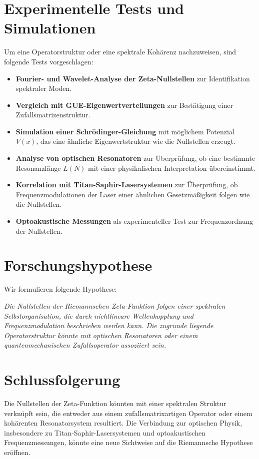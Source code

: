 \documentclass[a4paper,12pt]{article}
\begin{document}
\section{Experimentelle Tests und Simulationen}
Um eine Operatorstruktur oder eine spektrale Kohärenz nachzuweisen, sind folgende Tests vorgeschlagen:
\begin{itemize}
    \item \textbf{Fourier- und Wavelet-Analyse der Zeta-Nullstellen} zur Identifikation spektraler Moden.
    \item \textbf{Vergleich mit GUE-Eigenwertverteilungen} zur Bestätigung einer Zufallsmatrizenstruktur.
    \item \textbf{Simulation einer Schrödinger-Gleichung} mit möglichem Potenzial \(V(x)\), das eine ähnliche Eigenwertstruktur wie die Nullstellen erzeugt.
    \item \textbf{Analyse von optischen Resonatoren} zur Überprüfung, ob eine bestimmte Resonanzlänge \(L(N)\) mit einer physikalischen Interpretation übereinstimmt.
    \item \textbf{Korrelation mit Titan-Saphir-Lasersystemen} zur Überprüfung, ob Frequenzmodulationen der Laser einer ähnlichen Gesetzmäßigkeit folgen wie die Nullstellen.
    \item \textbf{Optoakustische Messungen} als experimenteller Test zur Frequenzordnung der Nullstellen.
\end{itemize}

\section{Forschungshypothese}
Wir formulieren folgende Hypothese:

\textit{Die Nullstellen der Riemannschen Zeta-Funktion folgen einer spektralen Selbstorganisation, die durch nichtlineare Wellenkopplung und Frequenzmodulation beschrieben werden kann. Die zugrunde liegende Operatorstruktur könnte mit optischen Resonatoren oder einem quantenmechanischen Zufallsoperator assoziiert sein.}

\section{Schlussfolgerung}
Die Nullstellen der Zeta-Funktion könnten mit einer spektralen Struktur verknüpft sein, die entweder aus einem zufallsmatrixartigen Operator oder einem kohärenten Resonatorsystem resultiert. Die Verbindung zur optischen Physik, insbesondere zu Titan-Saphir-Lasersystemen und optoakustischen Frequenzmessungen, könnte eine neue Sichtweise auf die Riemannsche Hypothese eröffnen.
\end{document}
